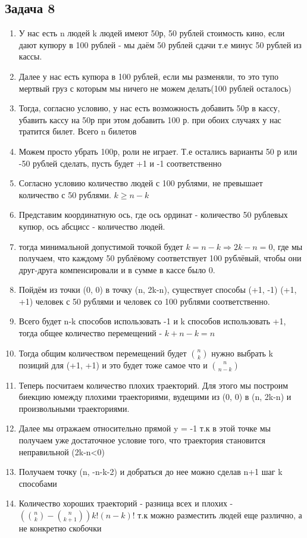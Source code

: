 \documentclass[a4paper,12pt]{article}
\begin{document}
\subsection{Задача 8}
\begin{enumerate}
    \item У нас есть n людей k людей имеют 50р, 50 рублей стоимость кино, если дают купюру в 100 рублей - мы даём 50 рублей сдачи т.е минус 50 рублей из кассы.
    \item Далее у нас есть купюра в 100 рублей, если мы разменяли, то это тупо мертвый груз с которым мы ничего не можем делать(100 рублей осталось)
    \item Тогда, согласно условию, у нас есть возможность добавить 50р в кассу, убавить кассу на 50р при этом добавить 100 р. при обоих случаях у нас тратится билет. Всего n билетов
    \item Можем просто убрать 100р, роли не играет. Т.е остались варианты 50 р или -50 рублей сделать, пусть будет +1 и -1 соответственно
    \item Согласно условию количество людей с 100 рублями, не превышает количество с 50 рублями. $k \ge n-k$
    \item Представим координатную ось, где ось ординат - количество 50 рублевых купюр, ось абсцисс - количество людей.
    \item тогда минимальной допустимой точкой будет $k=n-k \Rightarrow 2k-n=0$, где мы получаем, что каждому 50 рублёвому соответствует 100 рублёвый, чтобы они друг-друга компенсировали и в сумме в кассе было 0.
    \item Пойдём из точки (0, 0) в точку (n, 2k-n), существует способы (+1, -1) (+1, +1) человек с 50 рублями и человек со 100 рублями соответственно.
    \item Всего будет n-k способов использовать -1 и k способов использовать +1, тогда общее количество перемещений - $k+n-k = n $
    \item Тогда общим количеством перемещений будет $\binom{n}{k}$ нужно выбрать k позиций для (+1, +1) и это будет тоже самое что и $\binom{n}{n-k}$
    \item Теперь посчитаем количество плохих траекторий. Для этого мы построим биекцию юмежду плохими траекториями, вудещими из (0, 0) в (n, 2k-n) и произвольными траекториями.
    \item Далее мы отражаем относительно прямой y = -1 т.к в этой точке мы получаем уже достаточное условие того, что траектория становится неправильной (2k-n<0)
    \item Получаем точку (n, -n-k-2) и добраться до нее можно сделав n+1 шаг k способами
    \item Количество хороших траекторий - разница всех и плохих - $(\binom{n}{k}-\binom{n}{k+1})k!(n-k)!$ т.к можно разместить людей еще различно, а не конкретно скобочки

\end{enumerate}
\end{document}

